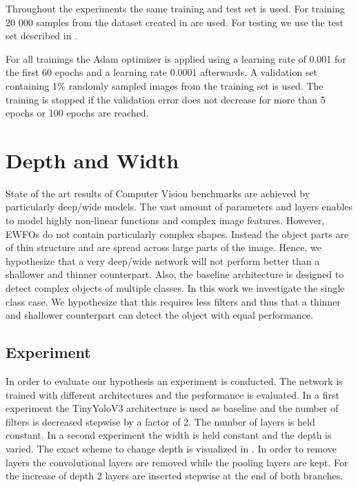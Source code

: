 	Throughout the experiments the same training and test set is used. For training 20 000 samples from the dataset created in  are used. For testing we use the test set described in .

	For all trainings the Adam optimizer is applied using a learning rate of 0.001 for the first 60 epochs and a learning rate 0.0001 afterwards. A validation set containing 1\% randomly sampled images from the training set is used. The training is stopped if the validation error does not decrease for more than 5 epochs or 100 epochs are reached.
	
	\section{Depth and Width}
	
	State of the art results of Computer Vision benchmarks are achieved by particularly deep/wide models. The vast amount of parameters and layers enables to model highly non-linear functions and complex image features. However, \acp{EWFO} do not contain particularly complex shapes. Instead the object parts are of thin structure and are spread across large parts of the image. Hence, we hypothesize that a very deep/wide network will not perform better than a shallower and thinner counterpart. Also, the baseline architecture is designed to detect complex objects of multiple classes. In this work we investigate the single class case. We hypothesize that this requires less filters and thus that a thinner and shallower counterpart can detect the object with equal performance.
	
	\subsection{Experiment}
	
	In order to evaluate our hypothesis an experiment is conducted. The network is trained with different architectures and the performance is evaluated. In a first experiment the TinyYoloV3 architecture is used as baseline and the number of filters is decreased stepwise by a factor of 2. The number of layers is held constant. In a second experiment the width is held constant and the depth is varied. The exact scheme to change depth is visualized in . In order to remove layers the convolutional layers are removed while the pooling layers are kept. For the increase of depth 2 layers are inserted stepwise at the end of both branches.  
	
